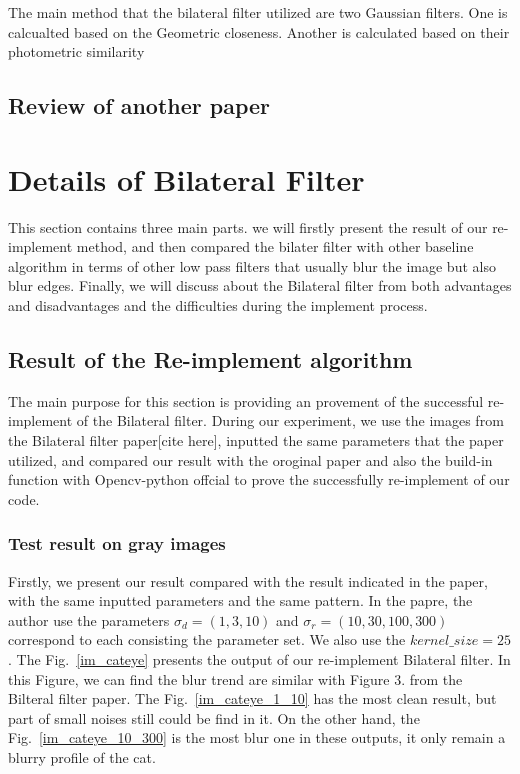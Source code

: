 \documentclass[12pt]{article}
\begin{document}
The main method that the bilateral filter utilized are two Gaussian filters. 
One is calcualted based on the Geometric closeness. 
Another is calculated based on their photometric similarity



\subsection{Review of another paper}


\section{Details of Bilateral Filter}
\label{section Bilateral_filter}
This section contains three main parts. we will firstly present the result of our re-implement method, and then compared the bilater filter with other baseline algorithm in terms of other low pass filters that usually blur the image but also blur edges. 
Finally, we will discuss about the Bilateral filter from both advantages and disadvantages and the difficulties during the implement process.


\subsection{Result of the Re-implement algorithm}
\label{section reimplement}
The main purpose for this section is providing an provement of the successful re-implement of the Bilateral filter.
During our experiment, we use the images from the Bilateral filter paper[cite here], inputted the same parameters that the paper utilized, and compared our result with the oroginal paper and also the build-in function with Opencv-python offcial to prove the successfully re-implement of our code.

\subsubsection{Test result on gray images}
\label{subsection test gray}
Firstly, we present our result compared with the result indicated in the paper, with the same inputted parameters and the same pattern.
In the papre, the author use the parameters $\sigma_d = (1, 3, 10)$ and $\sigma_r = (10, 30, 100, 300)$ correspond to each consisting the parameter set.  
We also use the $kernel\_size = 25$.
The Fig.~\ref{im_cateye} presents the output of our re-implement Bilateral filter.
In this Figure, we can find the blur trend are similar with Figure 3. from the Bilteral filter paper.
The Fig.~\ref{im_cateye_1_10} has the most clean result, but part of small noises still could be find in it. 
On the other hand, the Fig.~\ref{im_cateye_10_300} is the most blur one in these outputs, it only remain a blurry profile of the cat. 
\end{document}
